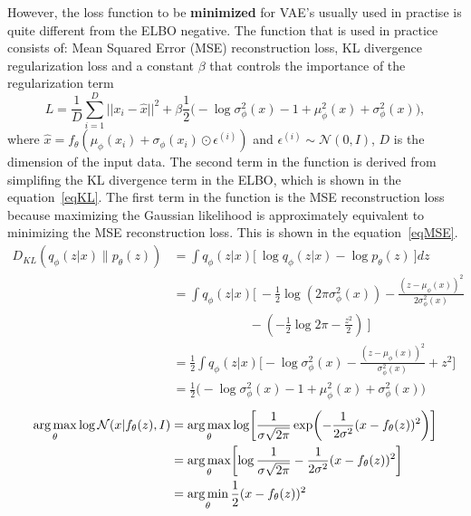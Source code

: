 However, the loss function to be \textbf{minimized} for VAE's usually used in practise is quite different from the ELBO negative. 
The function that is used in practice consists of: Mean Squared Error (MSE) reconstruction loss, KL divergence regularization loss and a constant $\beta$ that controls the importance of the regularization term
\[ L = \frac{1}{D} \sum_{i=1}^{D} ||x_i - \hat{x} ||^2 + \beta  \frac{1}{2} \biggl( -\log \sigma^2_\phi(x) - 1 + \mu^2_\phi(x) + \sigma^2_\phi(x) \biggr), \]
where $\hat{x} = f_{\theta}(\mu_{\phi}(x_i) + \sigma_{\phi}(x_i) \odot \epsilon^{(i)})$ and $\epsilon^{(i)} \sim \mathcal{N}(0, I)$, $D$ is the dimension of the input data. The second term in the function is derived from simplifing the KL divergence term in the ELBO, which is shown in the equation~\ref{eqKL}. The first term in the function is the MSE reconstruction loss because maximizing the Gaussian likelihood is approximately equivalent to minimizing the MSE reconstruction loss. This is shown in the equation~\ref{eqMSE}.
\begin{equation} \label{eqKL}
    \begin{split}
        D_{KL}(q_\phi(z|x) \| p_\theta(z)) &= \int q_\phi(z|x) \biggl[\ \log q_\phi(z|x) - \log p_\theta(z) \ \biggr] dz \\
        &= \int q_\phi(z|x) \biggl[\ -\frac{1}{2} \log (2\pi\sigma^2_\phi(x)) - \frac{(z - \mu_\phi(x))^2}{2\sigma^2_\phi(x)} \\
        &\qquad\qquad\qquad - \left( -\frac{1}{2} \log 2\pi - \frac{z^2}{2} \right) \ \biggr] \\
        &= \frac{1}{2} \int q_\phi(z|x) \biggl[ -\log \sigma^2_\phi(x) - \frac{(z - \mu_\phi(x))^2}{\sigma^2_\phi(x)} + z^2 \biggr] \\
        &= \frac{1}{2} \biggl( -\log \sigma^2_\phi(x) - 1 + \mu^2_\phi(x) + \sigma^2_\phi(x) \biggr)
    \end{split}
\end{equation}
\begin{equation} \label{eqMSE}
    \begin{split}
        \operatorname*{arg\,max}_{\theta} \log \mathcal{N}(x|f_{\theta}(z), I) & = \operatorname*{arg\,max}_{\theta} \log \biggl[\frac{1}{\sigma \sqrt{2\pi}} \exp \biggl( -\frac{1}{2 \sigma^2} (x - f_{\theta}(z))^2 \biggr)\biggr] \\
        & = \operatorname*{arg\,max}_{\theta} \biggl[ \log \frac{1}{\sigma \sqrt{2\pi}} - \frac{1}{2 \sigma^2} (x - f_{\theta}(z))^2 \biggl]\\
        & = \operatorname*{arg\,min}_{\theta} \frac{1}{2} (x - f_{\theta}(z))^2
    \end{split}
\end{equation}

